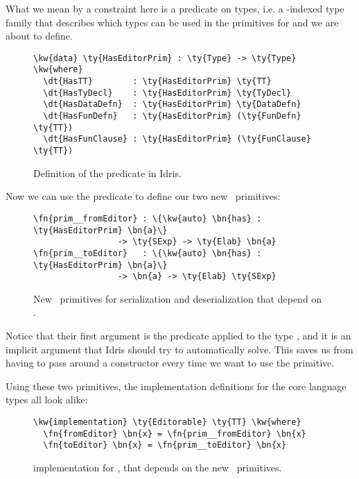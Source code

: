 What we mean by a constraint here is a predicate on types,
i.e. a -indexed type family that describes which types can be used in
the primitives for  and  we are about to define.

\begin{figure}[H]
\caption{Definition of the  predicate in Idris.}
\begin{Verbatim}[framesep=2mm, label=\footnotesize{\normalfont{Idris}}, labelposition=topline]
\kw{data} \ty{HasEditorPrim} : \ty{Type} -> \ty{Type} \kw{where}
  \dt{HasTT}        : \ty{HasEditorPrim} \ty{TT}
  \dt{HasTyDecl}    : \ty{HasEditorPrim} \ty{TyDecl}
  \dt{HasDataDefn}  : \ty{HasEditorPrim} \ty{DataDefn}
  \dt{HasFunDefn}   : \ty{HasEditorPrim} (\ty{FunDefn} \ty{TT})
  \dt{HasFunClause} : \ty{HasEditorPrim} (\ty{FunClause} \ty{TT})
\end{Verbatim}
\end{figure}

Now we can use the predicate  to define our two new
\Elab\ primitives:

\begin{figure}[H]
\caption{New \Elab\ primitives for serialization and deserialization that depend on .}
\label{code:newElabPrims}
\begin{Verbatim}[framesep=2mm, label=\footnotesize{\normalfont{Idris}}, labelposition=topline]
\fn{prim__fromEditor} : \{\kw{auto} \bn{has} : \ty{HasEditorPrim} \bn{a}\}
                 -> \ty{SExp} -> \ty{Elab} \bn{a}
\fn{prim__toEditor}   : \{\kw{auto} \bn{has} : \ty{HasEditorPrim} \bn{a}\}
                 -> \bn{a} -> \ty{Elab} \ty{SExp}
\end{Verbatim}
\end{figure}

Notice that their first argument is the predicate  applied to
the type , and it is an implicit argument that Idris should try to
automatically solve. This saves us from having to pass around a constructor
every time we want to use the primitive.

Using these two primitives, the  implementation definitions for
the core language types all look alike:

\begin{figure}[H]
\caption{ implementation for \TT, that depends on the new \Elab\ primitives.}
\begin{Verbatim}[framesep=2mm, label=\footnotesize{\normalfont{Idris}}, labelposition=topline]
\kw{implementation} \ty{Editorable} \ty{TT} \kw{where}
  \fn{fromEditor} \bn{x} = \fn{prim__fromEditor} \bn{x}
  \fn{toEditor} \bn{x} = \fn{prim__toEditor} \bn{x}
\end{Verbatim}
\end{figure}

